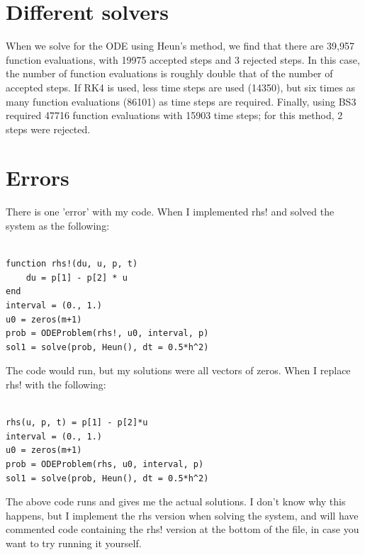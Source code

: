 \documentclass{article}
\begin{document}
\section*{Different solvers}

When we solve for the ODE using Heun's method, we find that there are 39,957 function evaluations, with 19975 accepted steps and 3 rejected steps. In this case, the number of function evaluations is roughly double that of the number of accepted steps. If RK4 is used, less time steps are used (14350), but six times as many function evaluations (86101) as time steps are required. Finally, using BS3 required 47716 function evaluations with 15903 time steps; for this method, 2 steps were rejected. 

\section*{Errors}

There is one 'error' with my code. When I implemented rhs! and solved the system as the following:

\begin{verbatim}

function rhs!(du, u, p, t)
    du = p[1] - p[2] * u
end
interval = (0., 1.)
u0 = zeros(m+1)
prob = ODEProblem(rhs!, u0, interval, p)
sol1 = solve(prob, Heun(), dt = 0.5*h^2)

\end{verbatim}

The code would run, but my solutions were all vectors of zeros. When I replace rhs! with the following:

\begin{verbatim}

rhs(u, p, t) = p[1] - p[2]*u
interval = (0., 1.)
u0 = zeros(m+1)
prob = ODEProblem(rhs, u0, interval, p)
sol1 = solve(prob, Heun(), dt = 0.5*h^2)

\end{verbatim}

The above code runs and gives me the actual solutions. I don't know why this happens, but I implement the rhs version when solving the system, and will have commented code containing the rhs! version at the bottom of the file, in case you want to try running it yourself. 
\end{document}
